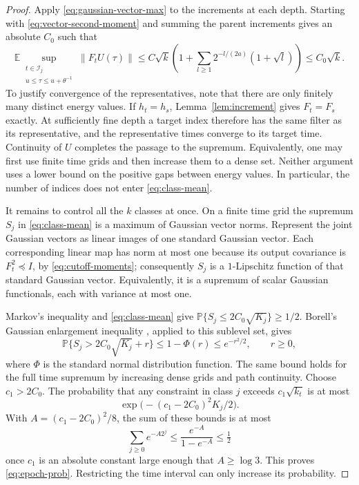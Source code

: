 \begin{proof}
Apply \eqref{eq:gaussian-vector-max} to the increments at each depth.
Starting with \eqref{eq:vector-second-moment} and summing the parent
increments gives an absolute $C_0$ such that
\begin{equation}\label{eq:class-mean}
 \mathbb E\sup_{\substack{t\in\mathcal I_j\\
                         u\le\tau\le u+\theta^{-1}}}
          \lVert F_tU(\tau)\rVert
 \le C\sqrt k\left(1+\sum_{l\ge1}
          2^{-l/(2a)}(1+\sqrt l)\right)
 \le C_0\sqrt k.
\end{equation}
To justify convergence of the representatives, note that there are only
finitely many distinct energy values.  If $h_t=h_s$,
Lemma~\ref{lem:increment} gives $F_t=F_s$ exactly.  At sufficiently fine
depth a target index therefore has the same filter as its representative,
and the representative times converge to its target time.  Continuity
of $U$ completes the passage to the supremum.  Equivalently, one may
first use finite time grids and then increase them to a dense set.
Neither argument uses a lower bound on the positive gaps between energy
values.  In particular, the number of indices does not enter
\eqref{eq:class-mean}.

It remains to control all the $k$ classes at once.  On a finite time
grid the supremum $S_j$ in \eqref{eq:class-mean} is a maximum of Gaussian
vector norms.  Represent the joint Gaussian vectors as linear images of
one standard Gaussian vector.  Each corresponding linear map has norm at
most one because its output covariance is $F_t^2\preceq I$, by
\eqref{eq:cutoff-moments}; consequently
$S_j$ is a $1$-Lipschitz function of that standard Gaussian vector.
Equivalently, it is a supremum of scalar Gaussian functionals, each
with variance at most one.

Markov's inequality and \eqref{eq:class-mean} give
$\mathbb P\{S_j\le2C_0\sqrt{K_j}\}\ge1/2$.
Borell's Gaussian enlargement inequality
\cite[Theorem~3.1]{Borell1975}, applied to this sublevel set, gives
\[
 \mathbb P\{S_j>2C_0\sqrt{K_j}+r\}
 \le1-\Phi(r)\le e^{-r^2/2},\qquad r\ge0,
\]
where $\Phi$ is the standard normal distribution function.  The same
bound holds for the full time supremum by increasing dense grids and
path continuity.  Choose $c_1>2C_0$.  The probability that any constraint in class
$j$ exceeds $c_1\sqrt{k_t}$ is at most
\[
 \exp\bigl(-(c_1-2C_0)^2K_j/2\bigr).
\]
With $A=(c_1-2C_0)^2/8$, the sum of these bounds is at most
\[
 \sum_{j\ge0}e^{-A2^j}
 \le\frac{e^{-A}}{1-e^{-A}}\le\tfrac12
\]
once $c_1$ is an absolute constant large enough that $A\ge\log3$.
This proves \eqref{eq:epoch-prob}.  Restricting the time interval can
only increase its probability.
\end{proof}


